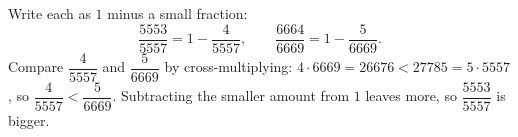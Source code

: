 Write each as $1$ minus a small fraction:
\[
\dfrac{5553}{5557}=1-\dfrac{4}{5557},\qquad\dfrac{6664}{6669}=1-\dfrac{5}{6669}.
\]
Compare $\dfrac{4}{5557}$ and $\dfrac{5}{6669}$ by cross-multiplying: $4\cdot6669=26676<27785=5\cdot5557$, so $\dfrac{4}{5557}<\dfrac{5}{6669}$. Subtracting the smaller amount from $1$ leaves more, so $\boxed{\dfrac{5553}{5557}}$ is bigger.
